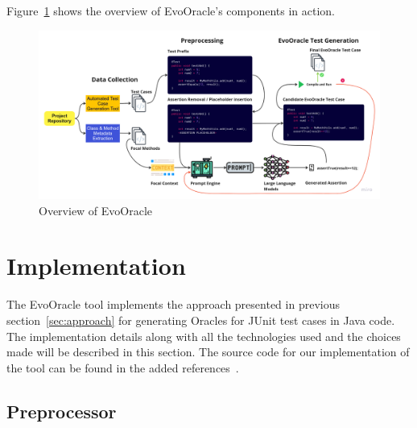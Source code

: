 Figure~\ref{fig:evooracle_overview} shows the overview of EvoOracle's components in action.

\begin{figure}[H]
\centering
\includegraphics[width=1\linewidth]{images/evooracle_overview.png}
\caption{Overview of EvoOracle}
\label{fig:evooracle_overview}
\end{figure}

\section{Implementation}
\label{sec:implementation}
\vspace{0.2 cm}
The EvoOracle tool implements the approach presented in previous section~\ref{sec:approach} for generating Oracles for JUnit test cases in Java code. The implementation details along with all the technologies used and the choices made will be described in this section. The source code for our implementation of the tool can be found in the added references~\cite{evooracle_github}.

\vspace{0.1 cm}
\subsection{Preprocessor}
\label{subsec:preprocessor_implementation}
\vspace{0.1 cm}

